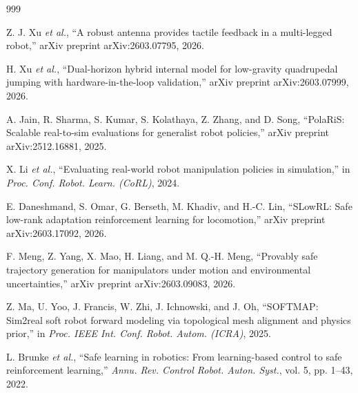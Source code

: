 \documentclass[12pt,a4paper,oneside]{report}
\begin{document}
\begin{thebibliography}{999}

Z. J. Xu \textit{et al.}, ``A robust antenna provides tactile feedback in a multi-legged robot,'' arXiv preprint arXiv:2603.07795, 2026.




H. Xu \textit{et al.}, ``Dual-horizon hybrid internal model for low-gravity quadrupedal jumping with hardware-in-the-loop validation,'' arXiv preprint arXiv:2603.07999, 2026.




A. Jain, R. Sharma, S. Kumar, S. Kolathaya, Z. Zhang, and D. Song, ``{PolaRiS}: Scalable real-to-sim evaluations for generalist robot policies,'' arXiv preprint arXiv:2512.16881, 2025.




X. Li \textit{et al.}, ``Evaluating real-world robot manipulation policies in simulation,'' in \textit{Proc. Conf. Robot. Learn. (CoRL)}, 2024.




E. Daneshmand, S. Omar, G. Berseth, M. Khadiv, and H.-C. Lin, ``{SLowRL}: Safe low-rank adaptation reinforcement learning for locomotion,'' arXiv preprint arXiv:2603.17092, 2026.




F. Meng, Z. Yang, X. Mao, H. Liang, and M. Q.-H. Meng, ``Provably safe trajectory generation for manipulators under motion and environmental uncertainties,'' arXiv preprint arXiv:2603.09083, 2026.




Z. Ma, U. Yoo, J. Francis, W. Zhi, J. Ichnowski, and J. Oh, ``{SOFTMAP}: Sim2real soft robot forward modeling via topological mesh alignment and physics prior,'' in \textit{Proc. IEEE Int. Conf. Robot. Autom. (ICRA)}, 2025.




L. Brunke \textit{et al.}, ``Safe learning in robotics: From learning-based control to safe reinforcement learning,'' \textit{Annu. Rev. Control Robot. Auton. Syst.}, vol. 5, pp. 1--43, 2022.




\end{thebibliography}
\end{document}
